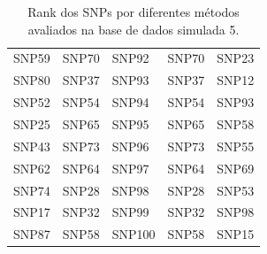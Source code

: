 \begin{table}[ht]
\begin{tabular}{lllll}
  SNP59 & SNP70 & SNP92 & SNP70 & SNP23 \\ 
  SNP80 & SNP37 & SNP93 & SNP37 & SNP12 \\ 
  SNP52 & SNP54 & SNP94 & SNP54 & SNP93 \\ 
  SNP25 & SNP65 & SNP95 & SNP65 & SNP58 \\ 
  SNP43 & SNP73 & SNP96 & SNP73 & SNP55 \\ 
  SNP62 & SNP64 & SNP97 & SNP64 & SNP69 \\ 
  SNP74 & SNP28 & SNP98 & SNP28 & SNP53 \\ 
  SNP17 & SNP32 & SNP99 & SNP32 & SNP98 \\ 
  SNP87 & SNP58 & SNP100 & SNP58 & SNP15 \\ 
   \hline
\end{tabular}
\caption{Rank dos SNPs por diferentes métodos avaliados na base de dados simulada 5.} 
\label{tab:ranks}
\end{table}
